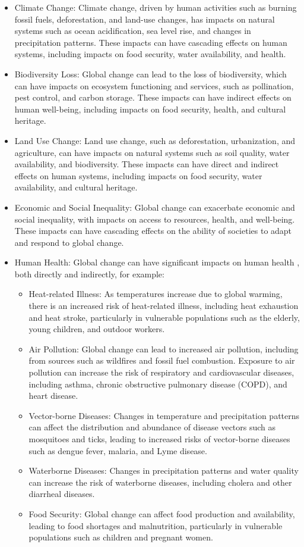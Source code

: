 \begin{itemize}
\item Climate Change: Climate change, driven by human activities such as burning fossil fuels, deforestation, and land-use changes, has impacts on natural systems such as ocean acidification, sea level rise, and changes in precipitation patterns. These impacts can have cascading effects on human systems, including impacts on food security, water availability, and health.
\item Biodiversity Loss: Global change can lead to the loss of biodiversity, which can have impacts on ecosystem functioning and services, such as pollination, pest control, and carbon storage. These impacts can have indirect effects on human well-being, including impacts on food security, health, and cultural heritage.
\item Land Use Change: Land use change, such as deforestation, urbanization, and agriculture, can have impacts on natural systems such as soil quality, water availability, and biodiversity. These impacts can have direct and indirect effects on human systems, including impacts on food security, water availability, and cultural heritage.
\item Economic and Social Inequality: Global change can exacerbate economic and social inequality, with impacts on access to resources, health, and well-being. These impacts can have cascading effects on the ability of societies to adapt and respond to global change.
\item Human Health: Global change can have significant impacts on human health \cite{WHO2018, Costello2009, Haines2006}, both directly and indirectly, for example:
  \begin{itemize}
  \item Heat-related Illness: As temperatures increase due to global warming, there is an increased risk of heat-related illness, including heat exhaustion and heat stroke, particularly in vulnerable populations such as the elderly, young children, and outdoor workers.
  \item Air Pollution: Global change can lead to increased air pollution, including from sources such as wildfires and fossil fuel combustion. Exposure to air pollution can increase the risk of respiratory and cardiovascular diseases, including asthma, chronic obstructive pulmonary disease (COPD), and heart disease.
  \item Vector-borne Diseases: Changes in temperature and precipitation patterns can affect the distribution and abundance of disease vectors such as mosquitoes and ticks, leading to increased risks of vector-borne diseases such as dengue fever, malaria, and Lyme disease.
  \item Waterborne Diseases: Changes in precipitation patterns and water quality can increase the risk of waterborne diseases, including cholera and other diarrheal diseases.
  \item Food Security: Global change can affect food production and availability, leading to food shortages and malnutrition, particularly in vulnerable populations such as children and pregnant women.
  \end{itemize}
\end{itemize}

